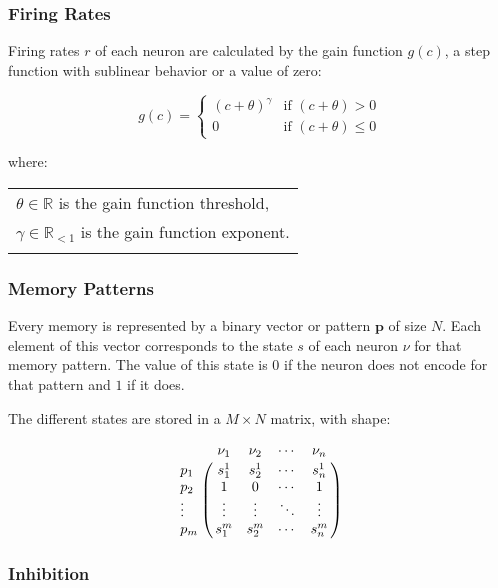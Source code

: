 \subsubsection{Firing Rates}

Firing rates \(r\) of each neuron are calculated by the gain function \(g(c)\), a step function with sublinear behavior or a value of zero:

        \begin{equation}
            g(c) =
            \begin{cases}
                (c + \theta)^{\gamma}   & \text{if~} (c + \theta) > 0 \\
                0                       & \text{if~} (c + \theta) \leq 0
            \end{cases}
        \label{eq:firing_rates} \end{equation}

        where:

        \begin{tabular}{l} \\
            \(\theta \in \mathbb{R}\) is the gain function threshold, \\
            \(\gamma \in \mathbb{R}_{<1}\) is the gain function exponent. \\
        \label{tab:conditions_firing_rates} \end{tabular} \bigskip


\subsubsection{Memory Patterns}

Every memory is represented by a binary vector or pattern \(\boldsymbol{p}\) of size \(N\).
Each element of this vector corresponds to the state \(s\) of each neuron \(\nu\) for that memory pattern.
The value of this state is \(0\) if the neuron does not encode for that pattern and \(1\) if it does.

The different states are stored in a \(M \times N\) matrix, with shape:

    \[\bordermatrix{
        ~ & \nu_1 & \nu_2 & \cdots & \nu_n  \cr
        p_1 &  s_{1}^{1} & s_{2}^{1} & \cdots & s_{n}^{1}  \cr
        p_2 &  1 & 0 & \cdots & 1  \cr
        \vdots &  \vdots  & \vdots & \ddots & \vdots  \cr
        p_m &  s_{1}^{m} & s_{2}^{m} & \cdots & s_{n}^{m}
    }\]


\subsubsection{Inhibition}


